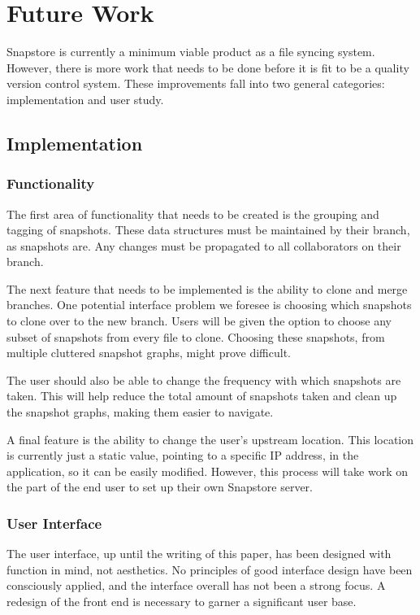 \chapter{Future Work}

Snapstore is currently a minimum viable product as a file syncing system. However, there is more work that needs to be done before it is fit to be a quality version control system. These improvements fall into two general categories: implementation and user study. 

\section{Implementation}

\subsection{Functionality}

The first area of functionality that needs to be created is the grouping and tagging of snapshots. These data structures must be maintained by their branch, as snapshots are. Any changes must be propagated to all collaborators on their branch.

The next feature that needs to be implemented is the ability to clone and merge branches. One potential interface problem we foresee is choosing which snapshots to clone over to the new branch. Users will be given the option to choose any subset of snapshots from every file to clone. Choosing these snapshots, from multiple cluttered snapshot graphs, might prove difficult.

The user should also be able to change the frequency with which snapshots are taken. This will help reduce the total amount of snapshots taken and clean up the snapshot graphs, making them easier to navigate.

A final feature is the ability to change the user's upstream location. This location is currently just a static value, pointing to a specific IP address, in the application, so it can be easily modified. However, this process will take work on the part of the end user to set up their own Snapstore server.

\subsection{User Interface}

The user interface, up until the writing of this paper, has been designed with function in mind, not aesthetics. No principles of good interface design have been consciously applied, and the interface overall has not been a strong focus. A redesign of the front end is necessary to garner a significant user base.

